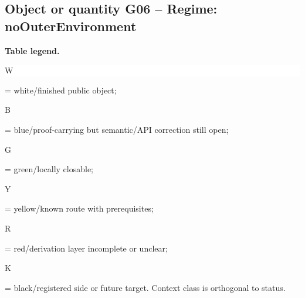\subsection*{Object or quantity G06 -- Regime: noOuterEnvironment}
\hypertarget{objproof:G06}{}
\par\smallskip\noindent\begin{minipage}{0.99\linewidth}\footnotesize\raggedright\textbf{Table legend.} \colorbox{white}{\strut W} = white/finished public object; \colorbox{cyan!20}{\strut B} = blue/proof-carrying but semantic/API correction still open; \colorbox{green!18}{\strut G} = green/locally closable; \colorbox{yellow!25}{\strut Y} = yellow/known route with prerequisites; \colorbox{red!20}{\strut R} = red/derivation layer incomplete or unclear; \colorbox{black!18}{\strut K} = black/registered side or future target. Context class is orthogonal to status.\end{minipage}\par\vspace{0.25em}
